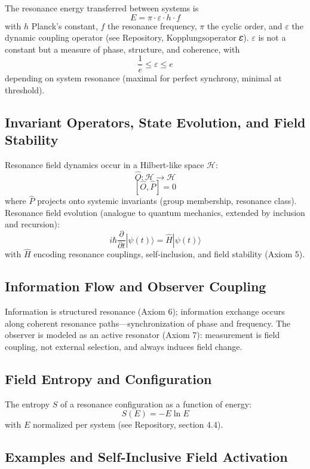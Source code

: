 \documentclass[12pt]{article}
\begin{document}
	The resonance energy transferred between systems is
	\[
	E = \pi \cdot \varepsilon \cdot h \cdot f
	\]
	with $h$ Planck's constant, $f$ the resonance frequency, $\pi$ the cyclic order, and $\varepsilon$ the dynamic coupling operator (see Repository, Kopplungsoperator 𝜀). $\varepsilon$ is not a constant but a measure of phase, structure, and coherence, with
	\[
	\frac{1}{e} \leq \varepsilon \leq e
	\]
	depending on system resonance (maximal for perfect synchrony, minimal at threshold).
	
	\subsection{Invariant Operators, State Evolution, and Field Stability}
	
	Resonance field dynamics occur in a Hilbert-like space $\mathcal{H}$:
	\[
	\hat{O} : \mathcal{H} \to \mathcal{H}
	\]
	\[
	[\hat{O}, \hat{P}] = 0
	\]
	where $\hat{P}$ projects onto systemic invariants (group membership, resonance class). Resonance field evolution (analogue to quantum mechanics, extended by inclusion and recursion):
	\[
	i\hbar \frac{\partial}{\partial t} |\psi(t)\rangle = \hat{H} |\psi(t)\rangle
	\]
	with $\hat{H}$ encoding resonance couplings, self-inclusion, and field stability (Axiom 5).
	
	\subsection{Information Flow and Observer Coupling}
	
	Information is structured resonance (Axiom 6); information exchange occurs along coherent resonance paths—synchronization of phase and frequency. The observer is modeled as an active resonator (Axiom 7): measurement is field coupling, not external selection, and always induces field change.

\subsection{Field Entropy and Configuration}

The entropy $S$ of a resonance configuration as a function of energy:
\[
S(E) = -E \ln E
\]
with $E$ normalized per system (see Repository, section 4.4).

\subsection{Examples and Self-Inclusive Field Activation}
\end{document}
